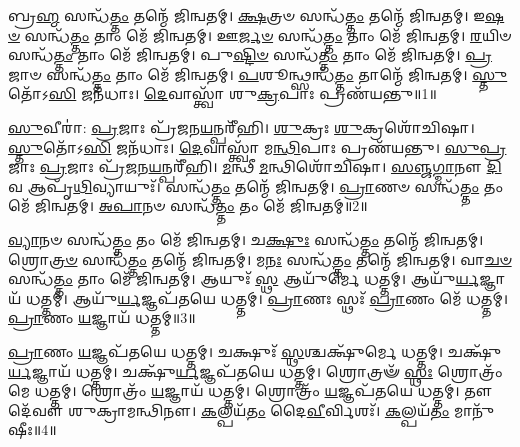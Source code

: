 \setcounter{anuvakam}{0}

𑌬𑍍𑌰\-\ul{𑌹𑍍𑌮} 𑌸𑌨𑍍𑌧᳴\-\ul{𑌤𑍍𑌤𑌂} 𑌤𑌨𑍍𑌮𑍇᳴ 𑌜𑌿𑌨𑍍𑌵𑌤𑌮𑍍।
\-\ul{𑌕𑍍𑌷}\-𑌤𑍍𑌰𑍞 𑌸𑌨𑍍𑌧᳴\-\ul{𑌤𑍍𑌤𑌂} 𑌤𑌨𑍍𑌮𑍇᳴ 𑌜𑌿𑌨𑍍𑌵𑌤𑌮𑍍।
𑌇\-\ul{𑌷}\-\-\ul{𑍞} 𑌸𑌨𑍍𑌧᳴\-\ul{𑌤𑍍𑌤𑌂} 𑌤𑌾𑌂 𑌮𑍇᳴ 𑌜𑌿𑌨𑍍𑌵𑌤𑌮𑍍।
𑌊\-\ul{𑌰𑍍𑌜}\-\-\ul{𑍞} 𑌸𑌨𑍍𑌧᳴\-\ul{𑌤𑍍𑌤𑌂} 𑌤𑌾𑌂 𑌮𑍇᳴ 𑌜𑌿𑌨𑍍𑌵𑌤𑌮𑍍।
\-\ul{𑌰}\-𑌯𑌿𑍞 𑌸𑌨𑍍𑌧᳴\-\ul{𑌤𑍍𑌤𑌂} 𑌤𑌾𑌂 𑌮𑍇᳴ 𑌜𑌿𑌨𑍍𑌵𑌤𑌮𑍍।
𑌪𑍁\-\ul{𑌷𑍍𑌟𑌿}\-\-\ul{𑍞} 𑌸𑌨𑍍𑌧᳴\-\ul{𑌤𑍍𑌤𑌂} 𑌤𑌾𑌂 𑌮𑍇᳴ 𑌜𑌿𑌨𑍍𑌵𑌤𑌮𑍍।
\-\ul{𑌪𑍍𑌰}\-𑌜𑌾𑍞 𑌸𑌨𑍍𑌧᳴\-\ul{𑌤𑍍𑌤𑌂} 𑌤𑌾𑌂 𑌮𑍇᳴ 𑌜𑌿𑌨𑍍𑌵𑌤𑌮𑍍।
\-\ul{𑌪}\-𑌶𑍂𑌨𑍍𑌥𑍍𑌸𑌨𑍍𑌧᳴\-\ul{𑌤𑍍𑌤𑌂} 𑌤𑌾𑌨𑍍𑌮𑍇᳴ 𑌜𑌿𑌨𑍍𑌵𑌤𑌮𑍍।
\-\ul{𑌸𑍍𑌤𑍁}\-𑌤𑍋᳴𑌽\-\ul{𑌸𑌿} 𑌜𑌨᳴𑌧𑌾𑌃।
\-\ul{𑌦𑍇}\-𑌵𑌾𑌸𑍍𑌤𑍍𑌵𑌾᳴ 𑌶𑍁\-\ul{𑌕𑍍𑌰}\-𑌪𑌾𑌃 𑌪𑍍𑌰𑌣᳴𑌯𑌨𑍍𑌤𑍁॥1॥

\-\ul{𑌸𑍁}\-𑌵𑍀𑌰𑌾॑: \ul{𑌪𑍍𑌰}\-𑌜𑌾𑌃 𑌪𑍍𑌰᳴\-\ul{𑌜}\-𑌨\-\ul{𑌯}\-𑌨𑍍𑌪𑌰𑍀᳴𑌹𑌿।
\-\ul{𑌶𑍁}\-𑌕𑍍𑌰𑌃 \ul{𑌶𑍁}\-𑌕𑍍𑌰𑌶𑍋᳴𑌚𑌿𑌷𑌾।
\-\ul{𑌸𑍍𑌤𑍁}\-𑌤𑍋᳴𑌽\-\ul{𑌸𑌿} 𑌜𑌨᳴𑌧𑌾𑌃।
\-\ul{𑌦𑍇}\-𑌵𑌾𑌸𑍍𑌤𑍍𑌵𑌾᳴ 𑌮\-\ul{𑌨𑍍𑌥𑌿}\-𑌪𑌾𑌃 𑌪𑍍𑌰𑌣᳴𑌯𑌨𑍍𑌤𑍁।
\-\ul{𑌸𑍁}\-\-\ul{𑌪𑍍𑌰}\-𑌜𑌾𑌃 \ul{𑌪𑍍𑌰}\-𑌜𑌾𑌃 𑌪𑍍𑌰᳴\-\ul{𑌜}\-𑌨\-\ul{𑌯}\-𑌨𑍍𑌪𑌰𑍀᳴𑌹𑌿।
\-\ul{𑌮}\-𑌨𑍍𑌥𑍀 \ul{𑌮}\-𑌨𑍍𑌥𑌿𑌶𑍋᳴𑌚𑌿𑌷𑌾।
\-\ul{𑌸}\-\-\ul{𑌞𑍍𑌜}\-\-\ul{𑌗𑍍𑌮𑌾}\-𑌨𑍗 \ul{𑌦𑌿}\-𑌵 𑌆𑌪𑍃᳴\-\ul{𑌥𑌿}\-𑌵𑍍𑌯𑌾𑌯𑍁𑌃᳴।
𑌸𑌨𑍍𑌧᳴\-\ul{𑌤𑍍𑌤𑌂} 𑌤𑌨𑍍𑌮𑍇᳴ 𑌜𑌿𑌨𑍍𑌵𑌤𑌮𑍍।
\-\ul{𑌪𑍍𑌰𑌾}\-𑌣𑍞 𑌸𑌨𑍍𑌧᳴\-\ul{𑌤𑍍𑌤𑌂} 𑌤𑌂 𑌮𑍇᳴ 𑌜𑌿𑌨𑍍𑌵𑌤𑌮𑍍।
\-\ul{𑌅}\-\-\ul{𑌪𑌾}\-𑌨𑍞 𑌸𑌨𑍍𑌧᳴\-\ul{𑌤𑍍𑌤𑌂} 𑌤𑌂 𑌮𑍇᳴ 𑌜𑌿𑌨𑍍𑌵𑌤𑌮𑍍॥2॥

\-\ul{𑌵𑍍𑌯𑌾}\-𑌨𑍞 𑌸𑌨𑍍𑌧᳴\-\ul{𑌤𑍍𑌤𑌂} 𑌤𑌂 𑌮𑍇᳴ 𑌜𑌿𑌨𑍍𑌵𑌤𑌮𑍍।
𑌚\-\ul{𑌕𑍍𑌷𑍁𑌃} 𑌸𑌨𑍍𑌧᳴\-\ul{𑌤𑍍𑌤𑌂} 𑌤𑌨𑍍𑌮𑍇᳴ 𑌜𑌿𑌨𑍍𑌵𑌤𑌮𑍍।
𑌶𑍍𑌰𑍋\-\ul{𑌤𑍍𑌰}\-\-\ul{𑍞} 𑌸𑌨𑍍𑌧᳴\-\ul{𑌤𑍍𑌤𑌂} 𑌤𑌨𑍍𑌮𑍇᳴ 𑌜𑌿𑌨𑍍𑌵𑌤𑌮𑍍।
𑌮\-\ul{𑌨𑌃} 𑌸𑌨𑍍𑌧᳴\-\ul{𑌤𑍍𑌤𑌂} 𑌤𑌨𑍍𑌮𑍇᳴ 𑌜𑌿𑌨𑍍𑌵𑌤𑌮𑍍।
𑌵𑌾\-\ul{𑌚}\-\-\ul{𑍞} 𑌸𑌨𑍍𑌧᳴\-\ul{𑌤𑍍𑌤𑌂} 𑌤𑌾𑌂 𑌮𑍇᳴ 𑌜𑌿𑌨𑍍𑌵𑌤𑌮𑍍।
𑌆𑌯𑍁𑌃᳴ \ul{𑌸𑍍𑌥} 𑌆𑌯𑍁᳴𑌰𑍍𑌮𑍇 𑌧𑌤𑍍𑌤𑌮𑍍।
𑌆𑌯𑍁᳴\-\ul{𑌰𑍍𑌯}\-𑌜𑍍𑌞𑌾𑌯᳴ 𑌧𑌤𑍍𑌤𑌮𑍍।
𑌆𑌯𑍁᳴\-\ul{𑌰𑍍𑌯}\-𑌜𑍍𑌞𑌪᳴𑌤𑌯𑍇 𑌧𑌤𑍍𑌤𑌮𑍍।
\-\ul{𑌪𑍍𑌰𑌾}\-𑌣𑌃 𑌸𑍍𑌥𑌃᳴ \ul{𑌪𑍍𑌰𑌾}\-𑌣𑌂 𑌮𑍇᳴ 𑌧𑌤𑍍𑌤𑌮𑍍।
\-\ul{𑌪𑍍𑌰𑌾}\-𑌣𑌂 \ul{𑌯}\-𑌜𑍍𑌞𑌾𑌯᳴ 𑌧𑌤𑍍𑌤𑌮𑍍॥3॥

\-\ul{𑌪𑍍𑌰𑌾}\-𑌣𑌂 \ul{𑌯}\-𑌜𑍍𑌞𑌪᳴𑌤𑌯𑍇 𑌧𑌤𑍍𑌤𑌮𑍍।
𑌚𑌕𑍍𑌷𑍁𑌃᳴ \ul{𑌸𑍍𑌥}\-𑌶𑍍𑌚𑌕𑍍𑌷𑍁᳴𑌰𑍍𑌮𑍇 𑌧𑌤𑍍𑌤𑌮𑍍।
𑌚𑌕𑍍𑌷𑍁᳴\-\ul{𑌰𑍍𑌯}\-𑌜𑍍𑌞𑌾𑌯᳴ 𑌧𑌤𑍍𑌤𑌮𑍍।
𑌚𑌕𑍍𑌷𑍁᳴\-\ul{𑌰𑍍𑌯}\-𑌜𑍍𑌞𑌪᳴𑌤𑌯𑍇 𑌧𑌤𑍍𑌤𑌮𑍍।
𑌶𑍍𑌰𑍋𑌤𑍍𑌰𑍟᳴ \ul{𑌸𑍍𑌥𑌃} 𑌶𑍍𑌰𑍋𑌤𑍍𑌰𑌂᳴ 𑌮𑍇 𑌧𑌤𑍍𑌤𑌮𑍍।
𑌶𑍍𑌰𑍋𑌤𑍍𑌰𑌂᳴ \ul{𑌯}\-𑌜𑍍𑌞𑌾𑌯᳴ 𑌧𑌤𑍍𑌤𑌮𑍍।
𑌶𑍍𑌰𑍋𑌤𑍍𑌰𑌂᳴ \ul{𑌯}\-𑌜𑍍𑌞𑌪᳴𑌤𑌯𑍇 𑌧𑌤𑍍𑌤𑌮𑍍।
𑌤𑍗 𑌦𑍇᳴𑌵𑍗 𑌶𑍁𑌕𑍍𑌰𑌾𑌮𑌨𑍍𑌥𑌿𑌨𑍗।
\-\ul{𑌕}\-𑌲𑍍𑌪𑌯᳴\-\ul{𑌤𑌂} 𑌦𑍈\-\ul{𑌵𑍀}\-𑌰𑍍𑌵𑌿𑌶𑌃᳴।
\-\ul{𑌕}\-𑌲𑍍𑌪𑌯᳴\-\ul{𑌤𑌂} 𑌮𑌾𑌨𑍁᳴𑌷𑍀𑌃॥4॥

